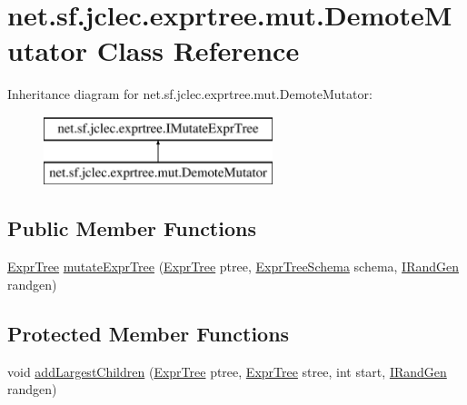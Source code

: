 \hypertarget{classnet_1_1sf_1_1jclec_1_1exprtree_1_1mut_1_1_demote_mutator}{\section{net.\-sf.\-jclec.\-exprtree.\-mut.\-Demote\-Mutator Class Reference}
\label{classnet_1_1sf_1_1jclec_1_1exprtree_1_1mut_1_1_demote_mutator}
}
Inheritance diagram for net.\-sf.\-jclec.\-exprtree.\-mut.\-Demote\-Mutator\-:\begin{figure}[H]
\begin{center}
\leavevmode
\includegraphics[height=2.000000cm]{classnet_1_1sf_1_1jclec_1_1exprtree_1_1mut_1_1_demote_mutator}
\end{center}
\end{figure}
\subsection*{Public Member Functions}
\begin{DoxyCompactItemize}
\item 
\hyperlink{classnet_1_1sf_1_1jclec_1_1exprtree_1_1_expr_tree}{Expr\-Tree} \hyperlink{classnet_1_1sf_1_1jclec_1_1exprtree_1_1mut_1_1_demote_mutator_a27bf3139df5f67ed273e0c0c3248b22c}{mutate\-Expr\-Tree} (\hyperlink{classnet_1_1sf_1_1jclec_1_1exprtree_1_1_expr_tree}{Expr\-Tree} ptree, \hyperlink{classnet_1_1sf_1_1jclec_1_1exprtree_1_1_expr_tree_schema}{Expr\-Tree\-Schema} schema, \hyperlink{interfacenet_1_1sf_1_1jclec_1_1util_1_1random_1_1_i_rand_gen}{I\-Rand\-Gen} randgen)
\end{DoxyCompactItemize}
\subsection*{Protected Member Functions}
\begin{DoxyCompactItemize}
\item 
void \hyperlink{classnet_1_1sf_1_1jclec_1_1exprtree_1_1mut_1_1_demote_mutator_abd3adfb71aea9f1091c53516b5233826}{add\-Largest\-Children} (\hyperlink{classnet_1_1sf_1_1jclec_1_1exprtree_1_1_expr_tree}{Expr\-Tree} ptree, \hyperlink{classnet_1_1sf_1_1jclec_1_1exprtree_1_1_expr_tree}{Expr\-Tree} stree, int start, \hyperlink{interfacenet_1_1sf_1_1jclec_1_1util_1_1random_1_1_i_rand_gen}{I\-Rand\-Gen} randgen)
\end{DoxyCompactItemize}


